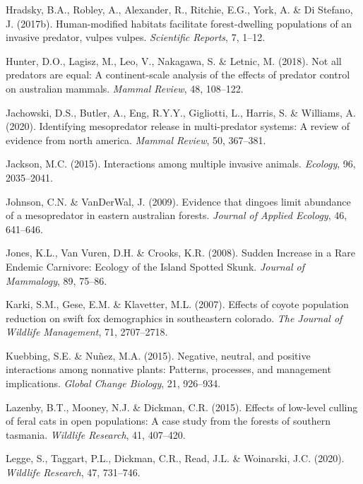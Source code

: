 \documentclass[]{elsarticle} %
\begin{document}
\leavevmode\hypertarget{ref-hradsky2017human}{}%
Hradsky, B.A., Robley, A., Alexander, R., Ritchie, E.G., York, A. \& Di Stefano, J. (2017b). Human-modified habitats facilitate forest-dwelling populations of an invasive predator, vulpes vulpes. \emph{Scientific Reports}, 7, 1--12.

\leavevmode\hypertarget{ref-hunter2018}{}%
Hunter, D.O., Lagisz, M., Leo, V., Nakagawa, S. \& Letnic, M. (2018). Not all predators are equal: A continent-scale analysis of the effects of predator control on australian mammals. \emph{Mammal Review}, 48, 108--122.

\leavevmode\hypertarget{ref-https:ux2fux2fdoi.orgux2f10.1111ux2fmam.12207}{}%
Jachowski, D.S., Butler, A., Eng, R.Y.Y., Gigliotti, L., Harris, S. \& Williams, A. (2020). Identifying mesopredator release in multi-predator systems: A review of evidence from north america. \emph{Mammal Review}, 50, 367--381.

\leavevmode\hypertarget{ref-jackson2015}{}%
Jackson, M.C. (2015). Interactions among multiple invasive animals. \emph{Ecology}, 96, 2035--2041.

\leavevmode\hypertarget{ref-https:ux2fux2fdoi.orgux2f10.1111ux2fj.1365-2664.2009.01650.x}{}%
Johnson, C.N. \& VanDerWal, J. (2009). Evidence that dingoes limit abundance of a mesopredator in eastern australian forests. \emph{Journal of Applied Ecology}, 46, 641--646.

\leavevmode\hypertarget{ref-jones2008sudden}{}%
Jones, K.L., Van Vuren, D.H. \& Crooks, K.R. (2008). Sudden Increase in a Rare Endemic Carnivore: Ecology of the Island Spotted Skunk. \emph{Journal of Mammalogy}, 89, 75--86.

\leavevmode\hypertarget{ref-karki2007}{}%
Karki, S.M., Gese, E.M. \& Klavetter, M.L. (2007). Effects of coyote population reduction on swift fox demographics in southeastern colorado. \emph{The Journal of Wildlife Management}, 71, 2707--2718.

\leavevmode\hypertarget{ref-kuebbing2015}{}%
Kuebbing, S.E. \& Nuñez, M.A. (2015). Negative, neutral, and positive interactions among nonnative plants: Patterns, processes, and management implications. \emph{Global Change Biology}, 21, 926--934.

\leavevmode\hypertarget{ref-lazenby2015}{}%
Lazenby, B.T., Mooney, N.J. \& Dickman, C.R. (2015). Effects of low-level culling of feral cats in open populations: A case study from the forests of southern tasmania. \emph{Wildlife Research}, 41, 407--420.

\leavevmode\hypertarget{ref-legge2020}{}%
Legge, S., Taggart, P.L., Dickman, C.R., Read, J.L. \& Woinarski, J.C. (2020). \emph{Wildlife Research}, 47, 731--746.
\end{document}
